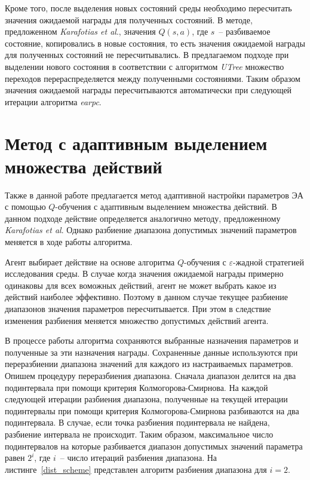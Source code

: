 Кроме того, после выделения новых состояний среды необходимо пересчитать значения ожидаемой награды для полученных состояний. В методе, предложенном \textit{Karafotias et al}., значения $Q(s, a)$, где $s$~-- разбиваемое состояние, копировались в новые состояния, то есть значения ожидаемой награды для полученных состояний не пересчитывались. В предлагаемом подходе при выделении нового состояния в соответствии с алгоритмом \textit{UTree} множество переходов перераспределяется между полученными состояниями. Таким образом значения ожидаемой награды пересчитываются автоматически при следующей итерации алгоритма \textit{earpc}.

\section{Метод с адаптивным выделением множества действий}
\label{adaptive_method}

Также в данной работе предлагается метод адаптивной настройки параметров ЭА с помощью $Q$-обучения с адаптивным выделением множества действий. В данном подходе действие определяется аналогично методу, предложенному \textit{Karafotias et al}. Однако разбиение диапазона допустимых значений параметров меняется в ходе работы алгоритма.

Агент выбирает действие на основе алгоритма $Q$-обучения с $\varepsilon$-жадной стратегией исследования среды. В случае когда значения ожидаемой награды примерно одинаковы для всех воможных действий, агент не может выбрать какое из действий наиболее эффективно. Поэтому в данном случае текущее разбиение диапазонов значения параметров пересчитывается. При этом в следствие изменения разбиения меняется множество допустимых действий агента.

В процессе работы алгоритма сохраняются выбранные назначения параметров и полученные за эти назначения награды. Сохраненные данные используются при переразбиении диапазона значений для каждого из настраиваемых параметров. Опишем процедуру переразбиения диапазона. Сначала диапазон делится на два подинтервала при помощи критерия Колмогорова-Смирнова. На каждой следующей итерации разбиения диапазона, полученные на текущей итерации подинтервалы при помощи критерия Колмогорова-Смирнова разбиваются на два подинтервала. В случае, если точка разбиения подинтервала не найдена, разбиение интервала не происходит. Таким образом, максимальное число подинтервалов на которые разбивается диапазон допустимых значений параметра равен $2^i$, где $i$~-- число итераций разбиения диапазона. На листинге~\ref{dist_scheme} представлен алгоритм разбиения диапазона для $i = 2$.


